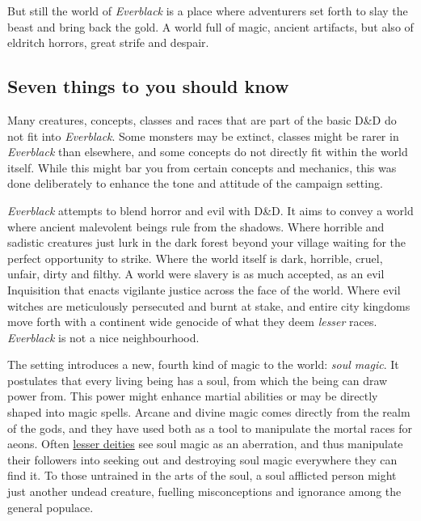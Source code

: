 But still the world of \emph{Everblack} is a place where adventurers set forth
to slay the beast and bring back the gold. A world full of magic, ancient
artifacts, but also of eldritch horrors, great strife and despair.

\subsection{Seven things to you should know}

\begin{enumerate}
  Many creatures, concepts, classes and
 races that are part of the basic D\&D do not fit into \emph{Everblack}. Some
 monsters may be extinct, classes might be rarer in \emph{Everblack} than
 elsewhere, and some concepts do not directly fit within the world
 itself. While this might bar you from certain concepts and mechanics, this
 was done deliberately to enhance the tone and attitude of the campaign
 setting.

  \emph{Everblack} attempts to blend horror and evil with
 D\&D. It aims to convey a world where ancient malevolent beings rule from the
 shadows. Where horrible and sadistic creatures just lurk in the dark forest
 beyond your village waiting for the perfect opportunity to strike. Where the
 world itself is dark, horrible, cruel, unfair, dirty and filthy. A world were
 slavery is as much accepted, as an evil Inquisition that enacts vigilante
 justice across the face of the world. Where evil witches are meticulously
 persecuted and burnt at stake, and entire city kingdoms move forth with a
 continent wide genocide of what they deem \emph{lesser} races.
 \emph{Everblack} is not a nice neighbourhood.

  The setting introduces a new, fourth kind of magic to the
 world: \emph{soul magic}. It postulates that every living being has a soul,
 from which the being can draw power from. This power might enhance martial
 abilities or may be directly shaped into magic spells. Arcane and divine
 magic comes directly from the realm of the gods, and they have used both as a
 tool to manipulate the mortal races for aeons. Often
 \hyperref[sec:Religion]{lesser deities} see soul magic as an aberration, and
 thus manipulate their followers into seeking out and destroying soul magic
 everywhere they can find it. To those untrained in the arts of the soul, a
 soul afflicted person might just another undead creature, fuelling
 misconceptions and ignorance among the general populace.


\end{enumerate}
